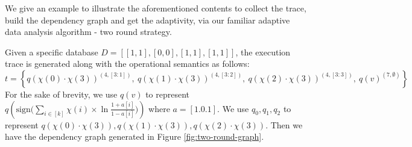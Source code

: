  We give an example to illustrate the aforementioned contents to collect the trace, build the dependency graph and get the adaptivity,  via our familiar adaptive data analysis algorithm - two round strategy. 


Given a specific database $D = [[1, 1], [0, 0], [1, 1], [1, 1]]$, the execution trace is generated along with the operational semantics as follows:
\[t = \left\{
q(\chi(0)\cdot \chi(3))^{(4, [3:1])}, \
q(\chi(1)\cdot \chi(3))^{(4, [3:2])}, \ 
q(\chi(2)\cdot \chi(3))^{(4, [3:3])}, \ 
q(v)^{(7, \emptyset)}
\right \}\]
For the sake of brevity, we use $q(v)$ to represent $q(\mathrm{sign}\big (\sum_{i\in [k]} \chi(i)\times\ln\frac{1+a[i]}{1-a[i]} \big ))$ where $a = [1.0.1]$.
We use $q_0, q_1, q_2$ to represent 
$ q(\chi(0)\cdot \chi(3)), 
q(\chi(1)\cdot \chi(3)),
q(\chi(2)\cdot \chi(3))$. 
Then we have the dependency graph generated in Figure \ref{fig:two-round-graph}. 

